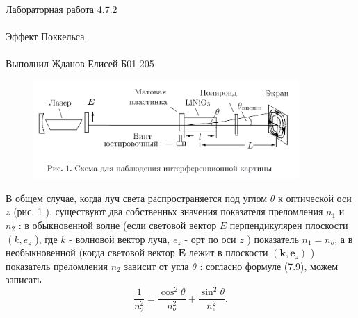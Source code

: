 \documentclass{astroedu-lab}
\begin{document}
\begin{problem}{\huge Лабораторная работа 4.7.2\\\\Эффект Поккельса\\\\Выполнил Жданов Елисей Б01-205}

\begin{figure}[!h]
	\centering
	\includegraphics[width=0.9\textwidth]{th1.png}
	\label{fig:boiler}
\end{figure}


В общем случае, когда луч света распространяется под углом $\theta$ к оптической оси $z$ (рис. 1 ), существуют два собственньх значения показателя преломления $n_1$ и $n_2$ : в обыкновенной волне (если световой вектор $E$ перпендикулярен плоскости $\left(k, e_z\right.$ ), где $k$ - волновой вектор луча, $e_z$ - орт по оси $z$ ) показатель $n_1=n_o$, а в необыкновенной (когда световой вектор $\boldsymbol{E}$ лежит в плоскости $\left(\boldsymbol{k}, \boldsymbol{e}_z\right)$ ) показатель преломления $n_2$ зависит от угла $\theta$ : согласно формуле (7.9), можем записать
$$
\frac{1}{n_2^2}=\frac{\cos ^2 \theta}{n_o^2}+\frac{\sin ^2 \theta}{n_e^2} .
$$


\end{problem}
\end{document}
